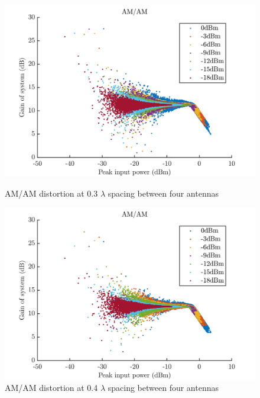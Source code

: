 \begin{figure}[H]
  \centering
  \begin{minipage}[b]{0.5\textwidth}
	\includegraphics[scale = 0.5]{figures/measurement/four_antenna/amam_0p3.png}
	\caption{AM/AM distortion at 0.3 $\lambda$ spacing between four antennas}
    \label{fig:amam03_4}
  \end{minipage}
  \hfill
  \begin{minipage}[b]{0.4\textwidth}
\includegraphics[scale = 0.5]{figures/measurement/four_antenna/amam_0p4.png}
\caption{AM/AM distortion at 0.4 $\lambda$ spacing between four antennas}
    \label{fig:amam04_4}
  \end{minipage}
\end{figure}

